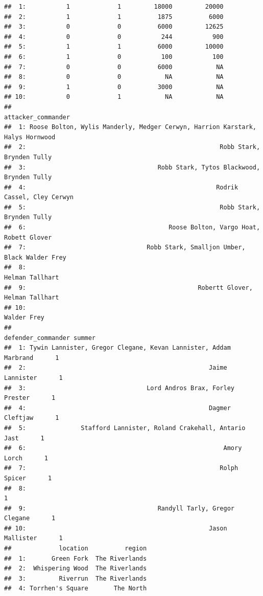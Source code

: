 \documentclass[]{book}
\begin{document}
\begin{verbatim}
##  1:           1             1         18000         20000
##  2:           1             1          1875          6000
##  3:           0             0          6000         12625
##  4:           0             0           244           900
##  5:           1             1          6000         10000
##  6:           1             0           100           100
##  7:           0             0          6000            NA
##  8:           0             0            NA            NA
##  9:           1             0          3000            NA
## 10:           0             1            NA            NA
##                                                                attacker_commander
##  1: Roose Bolton, Wylis Manderly, Medger Cerwyn, Harrion Karstark, Halys Hornwood
##  2:                                                     Robb Stark, Brynden Tully
##  3:                                    Robb Stark, Tytos Blackwood, Brynden Tully
##  4:                                                    Rodrik Cassel, Cley Cerwyn
##  5:                                                     Robb Stark, Brynden Tully
##  6:                                       Roose Bolton, Vargo Hoat, Robett Glover
##  7:                                 Robb Stark, Smalljon Umber, Black Walder Frey
##  8:                                                               Helman Tallhart
##  9:                                               Robertt Glover, Helman Tallhart
## 10:                                                                   Walder Frey
##                                                   defender_commander summer
##  1: Tywin Lannister, Gregor Clegane, Kevan Lannister, Addam Marbrand      1
##  2:                                                  Jaime Lannister      1
##  3:                                 Lord Andros Brax, Forley Prester      1
##  4:                                                  Dagmer Cleftjaw      1
##  5:               Stafford Lannister, Roland Crakehall, Antario Jast      1
##  6:                                                      Amory Lorch      1
##  7:                                                     Rolph Spicer      1
##  8:                                                                       1
##  9:                                    Randyll Tarly, Gregor Clegane      1
## 10:                                                  Jason Mallister      1
##             location          region
##  1:       Green Fork  The Riverlands
##  2:  Whispering Wood  The Riverlands
##  3:         Riverrun  The Riverlands
##  4: Torrhen's Square       The North

\end{verbatim}
\end{document}
